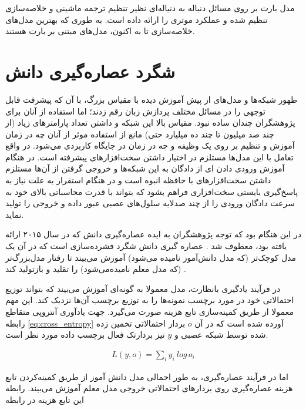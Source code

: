 مدل بارت بر روی مسائل دنباله به دنیاله‌ای نظیر تنظیم ترجمه ماشینی و خلاصه‌سازی تنظیم شده و عملکرد موثری را ارائه داده است. به طوری که بهترین مدل‌های خلاصه‌سازی تا به اکنون، مدل‌های مبتنی بر بارت هستند. 

\section{شگرد عصاره‌گیری دانش 
}
ظهور شبکه‌ها و مدل‌های از پیش آموزش دیده با مقیاس بزرگ، با آن که پیشرفت قابل توجهی را در مسائل مختلف پردازش زبان رقم زدند؛ اما استفاده از آنان برای پژوهشگران چندان ساده نبود.
مقیاس بالا این شبکه و داشتن تعداد پارامتر‌های زیاد (از چند صد میلیون تا چند ده میلیارد حتی) مانع از استفاده موثر از آنان چه در زمان آموزش و تنظیم بر روی یک وظیفه و چه در زمان 
در جایگاه کاربردی می‌شود. در واقع تعامل با این مدل‌ها مستلزم در اختیار داشتن سخت‌افزار‌های پیشرفته است. در هنگام آموزش ورودی دادن 
ای‌ از دادگان به این شبکه‌ها و خروجی گرفتن از آن‌ها مستلزم داشتن سخت‌افزار‌های با حافظه انبوه است و در هنگام استقرار به علت نیاز به پاسخ‌گیری 
بایستی سخت‌افزاری فراهم بشود که بتواند با قدرت محاسباتی بالای خود به سرعت دادگان ورودی را از چند صدلایه سلول‌های عصبی عبور داده و خروجی را تولید نماید. 

در این هنگام بود که توجه پژوهشگران به ایده عصاره‌گیری دانش
که در سال ۲۰۱۵ ارائه یافته بود، معطوف شد
\cite{hinton2015distilling}.
عصاره گیری دانش شگرد فشرده‌سازی است که در آن یک مدل کوچک‌تر (که مدل دانش‌آموز نامیده می‌شود) آموزش می‌بیند تا رفتار مدل‌بزرگ‌تر (که مدل معلم نامیده‌می‌شود) را تقلید و بازتولید کند
\cite{hinton2015distilling}.

در فرآیند یادگیری بانظارت، مدل معمولا به گونه‌ای آموزش می‌بیند که بتواند توزیع احتمالاتی خود در مورد برچسب نمونه‌ها را به توزیع 
برچسب‌ آن‌ها نزدیک کند. این مهم معمولا از طریق کمینه‌سازی تابع هزینه
صورت می‌گیرد. جهت یادآوری آنتروپی متقاطع رابطه
\ref{eq:cross_entropy}
 آورده شده است که در آن $o$ بردار احتمالاتی تخمین زده شده توسط شبکه عصبی و $y$ نیز بردارتک فعال برچسب داده مورد نظر است.


\begin{align} \label{eq:cross_entropy}
L(y, o) = \sum_{i}^{} y_i\:log\,o_i
\end{align}

اما در فرآیند عصاره‌گیری، به طور اجمالی مدل دانش آموز از طریق کمینه‌کردن تابع هزینه عصاره‌گیری روی بردار‌های احتمالاتی خروجی مدل معلم آموزش می‌بیند. رابطه این تابع هزینه در رابطه

